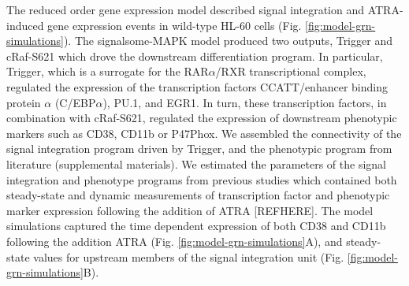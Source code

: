 \documentclass[12pt]{article}
\begin{document}
The reduced order gene expression model described signal integration and ATRA-induced gene expression events in wild-type HL-60 cells (Fig. \ref{fig:model-grn-simulations}).
The signalsome-MAPK model produced two outputs, Trigger and cRaf-S621 which drove the downstream differentiation program.
In particular, Trigger, which is a surrogate for the RAR$\alpha$/RXR transcriptional complex, regulated the expression of the transcription factors
CCATT/enhancer binding protein $\alpha$ (C/EBP$\alpha$), PU.1, and EGR1. In turn, these transcription factors, in combination with cRaf-S621, regulated
the expression of downstream phenotypic markers such as CD38, CD11b or P47Phox.
We assembled the connectivity of the signal integration program driven by Trigger, and the phenotypic program from literature (supplemental materials).
We estimated the parameters of the signal integration and phenotype programs from previous studies which contained both steady-state and dynamic measurements
of transcription factor and phenotypic marker expression following the addition of ATRA [REFHERE].
The model simulations captured the time dependent expression of both CD38 and CD11b following the addition ATRA (Fig. \ref{fig:model-grn-simulations}A), and
steady-state values for upstream members of the signal integration unit (Fig. \ref{fig:model-grn-simulations}B).

\end{document}

